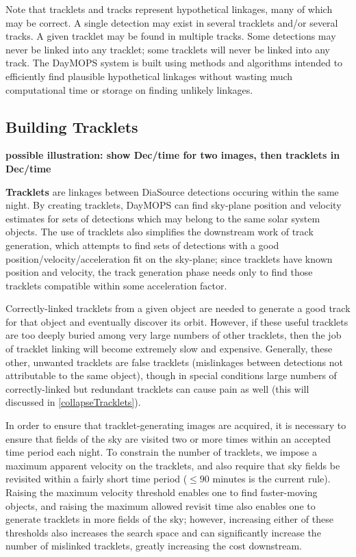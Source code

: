 Note that tracklets and tracks represent hypothetical linkages, many
of which may be correct.  A single detection may exist in several
tracklets and/or several tracks.  A given tracklet may be found in
multiple tracks.  Some detections may never be linked into any
tracklet; some tracklets will never be linked into any track.  The
DayMOPS system is built using methods and algorithms intended to
efficiently find plausible hypothetical linkages without wasting much
computational time or storage on finding unlikely linkages.

\subsection{Building Tracklets}

\textbf{ possible illustration: show Dec/time for two images, then tracklets in Dec/time}

\textbf{Tracklets} are linkages between DiaSource detections occuring
within the same night. By creating tracklets, DayMOPS can find
sky-plane position and velocity estimates for sets of detections which
may belong to the same solar system objects.  The use of tracklets
also simplifies the downstream work of track generation, which
attempts to find sets of detections with a good
position/velocity/acceleration fit on the sky-plane; since tracklets
have known position and velocity, the track generation phase needs
only to find those tracklets compatible within some acceleration
factor.

Correctly-linked tracklets from a given object are needed to generate
a good track for that object and eventually discover its orbit.
However, if these useful tracklets are too deeply buried among very
large numbers of other tracklets, then the job of tracklet linking
will become extremely slow and expensive.  Generally, these other,
unwanted tracklets are false tracklets (mislinkages between detections
not attributable to the same object), though in special conditions
large numbers of correctly-linked but redundant tracklets can cause
pain as well (this will discussed in \ref{collapseTracklets}).

In order to ensure that tracklet-generating images are acquired, it is
necessary to ensure that fields of the sky are visited two or more
times within an accepted time period each night. To constrain the
number of tracklets, we impose a maximum apparent velocity on the
tracklets, and also require that sky fields be revisited within a
fairly short time period ($\leq 90$ minutes is the current rule).
Raising the maximum velocity threshold enables one to find
faster-moving objects, and raising the maximum allowed revisit time
also enables one to generate tracklets in more fields of the sky;
however, increasing either of these thresholds also increases the
search space and can significantly increase the number of mislinked
tracklets, greatly increasing the cost downstream.




